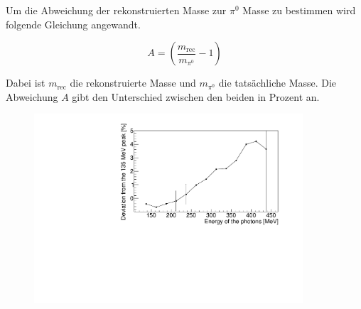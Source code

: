 \documentclass[a4paper,11pt,oneside,final,german,openbib,pdftex]{scrbook}
\begin{document}
{%
%		
 
 
 
 Um die Abweichung der rekonstruierten Masse zur $\pi^0$ Masse zu bestimmen wird folgende Gleichung angewandt.
 
 \begin{equation}
 A = (\frac{m_{\text{rec}}}{m_{\pi^0}}-1)
 \end{equation}
 
 Dabei ist $m_{\text{rec}}$ die rekonstruierte Masse und $m_{\pi^0}$ die tats\"achliche Masse. Die Abweichung $A$ gibt den Unterschied zwischen den beiden in Prozent an.
 
 
 \begin{figure}[h!]
 	\begin{center}
 		\includegraphics[width=100mm]{20170405StrahlzeitDeviatoinNoCut}
 	

\end{center}
\end{figure}}
\end{document}
